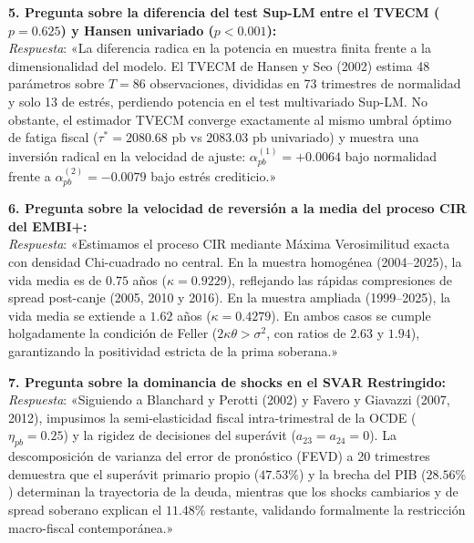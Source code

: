 \documentclass[11pt,a4paper]{article}
\begin{document}
\begin{mdframed}[style=infobox]
\vspace{0.2cm}
\textbf{5. Pregunta sobre la diferencia del test Sup-LM entre el TVECM ($p=0.625$) y Hansen univariado ($p < 0.001$):}\\
\textit{Respuesta}: «La diferencia radica en la potencia en muestra finita frente a la dimensionalidad del modelo. El TVECM de Hansen y Seo (2002) estima 48 parámetros sobre $T=86$ observaciones, divididas en 73 trimestres de normalidad y solo 13 de estrés, perdiendo potencia en el test multivariado Sup-LM. No obstante, el estimador TVECM converge exactamente al mismo umbral óptimo de fatiga fiscal ($\tau^* = 2080.68\text{ pb}$ vs $2083.03\text{ pb}$ univariado) y muestra una inversión radical en la velocidad de ajuste: $\alpha_{pb}^{(1)} = +0.0064$ bajo normalidad frente a $\alpha_{pb}^{(2)} = -0.0079$ bajo estrés crediticio.»

\vspace{0.2cm}
\textbf{6. Pregunta sobre la velocidad de reversión a la media del proceso CIR del EMBI+:}\\
\textit{Respuesta}: «Estimamos el proceso CIR mediante Máxima Verosimilitud exacta con densidad Chi-cuadrado no central. En la muestra homogénea (2004--2025), la vida media es de $0.75$ años ($\kappa = 0.9229$), reflejando las rápidas compresiones de spread post-canje (2005, 2010 y 2016). En la muestra ampliada (1999--2025), la vida media se extiende a $1.62$ años ($\kappa = 0.4279$). En ambos casos se cumple holgadamente la condición de Feller ($2\kappa\theta > \sigma^2$, con ratios de $2.63$ y $1.94$), garantizando la positividad estricta de la prima soberana.»

\vspace{0.2cm}
\textbf{7. Pregunta sobre la dominancia de shocks en el SVAR Restringido:}\\
\textit{Respuesta}: «Siguiendo a Blanchard y Perotti (2002) y Favero y Giavazzi (2007, 2012), impusimos la semi-elasticidad fiscal intra-trimestral de la OCDE ($\eta_{pb}=0.25$) y la rigidez de decisiones del superávit ($a_{23}=a_{24}=0$). La descomposición de varianza del error de pronóstico (FEVD) a 20 trimestres demuestra que el superávit primario propio ($47.53\%$) y la brecha del PIB ($28.56\%$) determinan la trayectoria de la deuda, mientras que los shocks cambiarios y de spread soberano explican el $11.48\%$ restante, validando formalmente la restricción macro-fiscal contemporánea.»


\end{mdframed}
\end{document}
